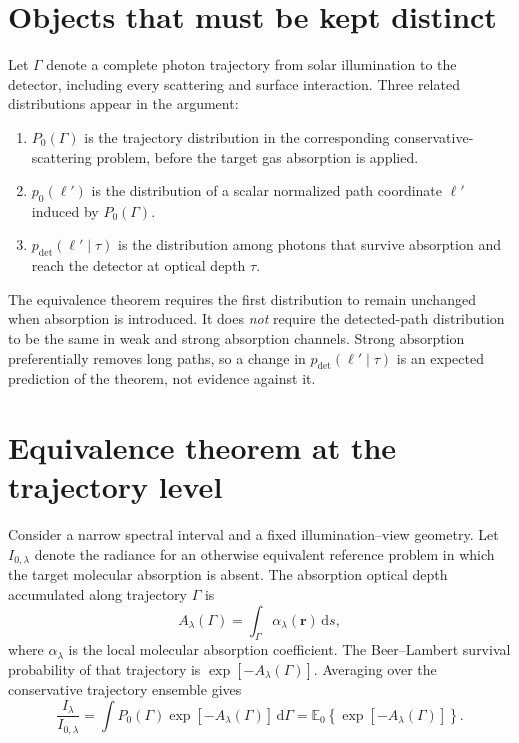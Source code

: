 \documentclass[11pt]{article}
\newcommand{\dd}{\,\mathrm{d}}
\newcommand{\E}{\mathbb{E}}
\newcommand{\lp}{\ell'}
\begin{document}
\section{Objects that must be kept distinct}

Let $\Gamma$ denote a complete photon trajectory from solar illumination to the
detector, including every scattering and surface interaction.  Three related
distributions appear in the argument:

\begin{enumerate}
  \item $P_0(\Gamma)$ is the trajectory distribution in the corresponding
        conservative-scattering problem, before the target gas absorption is
        applied.
  \item $p_0(\lp)$ is the distribution of a scalar normalized path coordinate
        $\lp$ induced by $P_0(\Gamma)$.
  \item $p_{\mathrm{det}}(\lp\mid\tau)$ is the distribution among photons that
        survive absorption and reach the detector at optical depth $\tau$.
\end{enumerate}

The equivalence theorem requires the first distribution to remain unchanged
when absorption is introduced.  It does \emph{not} require the detected-path
distribution to be the same in weak and strong absorption channels.  Strong
absorption preferentially removes long paths, so a change in
$p_{\mathrm{det}}(\lp\mid\tau)$ is an expected prediction of the theorem, not
evidence against it.

\section{Equivalence theorem at the trajectory level}

Consider a narrow spectral interval and a fixed illumination--view geometry.
Let $I_{0,\lambda}$ denote the radiance for an otherwise equivalent reference
problem in which the target molecular absorption is absent.  The absorption
optical depth accumulated along trajectory $\Gamma$ is
\begin{equation}
  A_\lambda(\Gamma)
  = \int_\Gamma \alpha_\lambda(\bm r)\dd s,
  \label{eq:path_absorption}
\end{equation}
where $\alpha_\lambda$ is the local molecular absorption coefficient.  The
Beer--Lambert survival probability of that trajectory is
$\exp[-A_\lambda(\Gamma)]$.  Averaging over the conservative trajectory
ensemble gives
\begin{equation}
  \frac{I_\lambda}{I_{0,\lambda}}
  = \int P_0(\Gamma)
      \exp[-A_\lambda(\Gamma)]\dd\Gamma
  = \E_0\!\left\{\exp[-A_\lambda(\Gamma)]\right\}.
  \label{eq:general_equivalence}
\end{equation}
\end{document}
